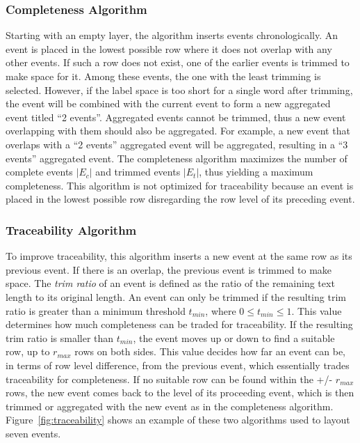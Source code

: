 \subsubsection{Completeness Algorithm}
Starting with an empty layer, the algorithm inserts events chronologically. An event is placed in the lowest possible row where it does not overlap with any other events. If such a row does not exist, one of the earlier events is trimmed to make space for it. Among these events, the one with the least trimming is selected. However, if the label space is too short for a single word after trimming, the event will be combined with the current event to form a new aggregated event titled ``2 events''. Aggregated events cannot be trimmed, thus a new event overlapping with them should also be aggregated. For example, a new event that overlaps with a ``2 events'' aggregated event will be aggregated, resulting in a ``3 events'' aggregated event. The completeness algorithm maximizes the number of complete events $|E_c|$ and trimmed events $|E_t|$, thus yielding a maximum completeness. This algorithm is not optimized for traceability because an event is placed in the lowest possible row disregarding the row level of its preceding event.

\subsubsection{Traceability Algorithm}
To improve traceability, this algorithm inserts a new event at the same row as its previous event. If there is an overlap, the previous event is trimmed to make space. The \emph{trim ratio} of an event is defined as the ratio of the remaining text length to its original length. An event can only be trimmed if the resulting trim ratio is greater than a minimum threshold $t_{min}$, where $0\leq t_{min} \leq 1$. This value determines how much completeness can be traded for traceability. If the resulting trim ratio is smaller than $t_{min}$, the event moves up or down to find a suitable row, up to $r_{max}$ rows on both sides. This value decides how far an event can be, in terms of row level difference, from the previous event, which essentially trades traceability for completeness. If no suitable row can be found within the +/- $r_{max}$ rows, the new event comes back to the level of its proceeding event, which is then trimmed or aggregated with the new event as in the completeness algorithm. Figure~\ref{fig:traceability} shows an example of these two algorithms used to layout seven events.

